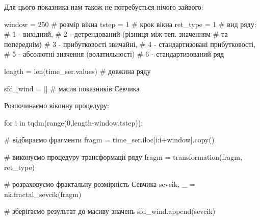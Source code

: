 \documentclass[
  letterpaper,
]{report}
\newenvironment{Shaded}{\begin{snugshade}}{\end{snugshade}}
\newcommand{\BuiltInTok}[1]{\textcolor[rgb]{0.00,0.23,0.31}{#1}}
\newcommand{\CommentTok}[1]{\textcolor[rgb]{0.37,0.37,0.37}{#1}}
\newcommand{\ControlFlowTok}[1]{\textcolor[rgb]{0.00,0.23,0.31}{#1}}
\newcommand{\DecValTok}[1]{\textcolor[rgb]{0.68,0.00,0.00}{#1}}
\newcommand{\KeywordTok}[1]{\textcolor[rgb]{0.00,0.23,0.31}{#1}}
\newcommand{\NormalTok}[1]{\textcolor[rgb]{0.00,0.23,0.31}{#1}}
\newcommand{\OperatorTok}[1]{\textcolor[rgb]{0.37,0.37,0.37}{#1}}
\begin{document}
Для цього показника нам також не потребується нічого зайвого:

\begin{Shaded}
\begin{Highlighting}[]
\NormalTok{window }\OperatorTok{=} \DecValTok{250}    \CommentTok{\# розмір вікна}
\NormalTok{tstep }\OperatorTok{=} \DecValTok{1}       \CommentTok{\# крок вікна}
\NormalTok{ret\_type }\OperatorTok{=} \DecValTok{1}    \CommentTok{\# вид ряду: }
                \CommentTok{\# 1 {-} вихідний, }
                \CommentTok{\# 2 {-} детрендований (різниця між теп. значенням }
                                                \CommentTok{\# та попереднім)}
                \CommentTok{\# 3 {-} прибутковості звичайні, }
                \CommentTok{\# 4 {-} стандартизовані прибутковості, }
                \CommentTok{\# 5 {-} абсолютні значення (волатильності)}
                \CommentTok{\# 6 {-} стандартизований ряд}

\NormalTok{length }\OperatorTok{=} \BuiltInTok{len}\NormalTok{(time\_ser.values)      }\CommentTok{\# довжина ряду}

\NormalTok{sfd\_wind }\OperatorTok{=}\NormalTok{ []                      }\CommentTok{\# масив показників Севчика}
\end{Highlighting}
\end{Shaded}

Розпочинаємо віконну процедуру:

\begin{Shaded}
\begin{Highlighting}[]
\ControlFlowTok{for}\NormalTok{ i }\KeywordTok{in}\NormalTok{ tqdm(}\BuiltInTok{range}\NormalTok{(}\DecValTok{0}\NormalTok{,length}\OperatorTok{{-}}\NormalTok{window,tstep)):}
    
    \CommentTok{\# відбираємо фрагменти}
\NormalTok{    fragm }\OperatorTok{=}\NormalTok{ time\_ser.iloc[i:i}\OperatorTok{+}\NormalTok{window].copy()  }

    \CommentTok{\# виконуємо процедуру трансформації ряду }
\NormalTok{    fragm }\OperatorTok{=}\NormalTok{ transformation(fragm, ret\_type)}

    \CommentTok{\# розраховуємо фрактальну розмірність Севчика}
\NormalTok{    sevcik, \_ }\OperatorTok{=}\NormalTok{ nk.fractal\_sevcik(fragm)}

    \CommentTok{\# зберігаємо результат до масиву значень}
\NormalTok{    sfd\_wind.append(sevcik)}
\end{Highlighting}
\end{Shaded}
\end{document}
